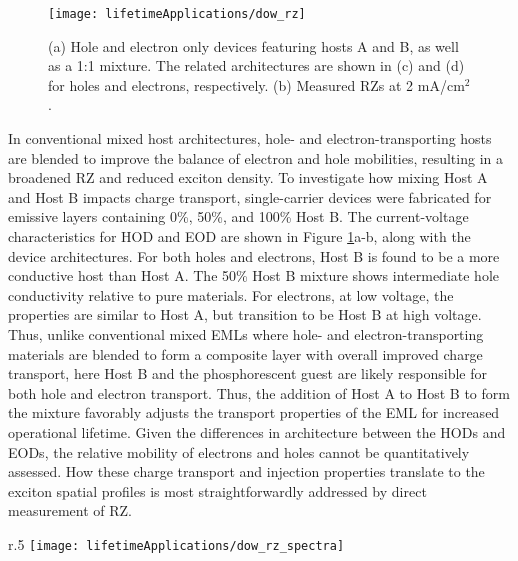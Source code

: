 \documentclass[../thesis.tex]{subfiles}
\begin{document}
\begin{figure}[ht]
\centering
\texttt{[image: lifetimeApplications/dow\_rz]}
\caption{(a) Hole and electron only devices featuring hosts A and B, as well as a 1:1 mixture.  The related architectures are shown in (c) and (d) for holes and electrons, respectively.  (b) Measured RZs at 2 mA/cm$^2$.}
\label{fig:dow_rz}
\end{figure}


In conventional mixed host architectures, hole- and electron-transporting hosts are blended to improve the balance of electron and hole mobilities, resulting in a broadened RZ and reduced exciton density.\supercite{Chwang2002,Erickson2013a,Han2016,Kondakova2008a}
To investigate how mixing Host A and Host B impacts charge transport, single-carrier devices were fabricated for emissive layers containing 0\%, 50\%, and 100\% Host B. 
The current-voltage characteristics for HOD and EOD are shown in Figure \ref{fig:dow_rz}a-b, along with the device architectures.
For both holes and electrons, Host B is found to be a more conductive host than Host A. 
The 50\% Host B mixture shows intermediate hole conductivity relative to pure materials. 
For electrons, at low voltage, the properties are similar to Host A, but transition to be Host B at high voltage. 
Thus, unlike conventional mixed EMLs where hole- and electron-transporting materials are blended to form a composite layer with overall improved charge transport, here Host B and the phosphorescent guest are likely responsible for both hole and electron transport. 
Thus, the addition of Host A to Host B to form the mixture favorably adjusts the transport properties of the EML for increased operational lifetime. 
Given the differences in architecture between the HODs and EODs, the relative mobility of electrons and holes cannot be quantitatively assessed. 
How these charge transport and injection properties translate to the exciton spatial profiles is most straightforwardly addressed by direct measurement of RZ.

\begin{wrapfigure}{r}{.5\textwidth}
\centering
\texttt{[image: lifetimeApplications/dow\_rz\_spectra]}
\caption{Raw spectral data for RZ measurements for hosts A, B and a 1:1 mixture}
\label{fig:dow_rz_spectra}
\end{wrapfigure}
\end{document}
